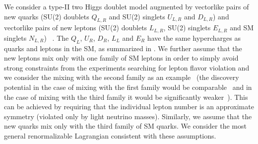 


We consider a type-II two Higgs doublet model augmented by vectorlike pairs of new quarks (SU(2) doublets $Q_{L,R}$ and SU(2) singlets $U_{L,R}$ and $D_{L,R}$)
and vectorlike pairs of new leptons (SU(2) doublets $L_{L,R}$,  SU(2) singlets $E_{L,R}$ and  SM singlets $N_{L,R}$)~ \cite{Dermisek:2015oja}. The  $Q_{L}$, $U_{R}$,  $D_{R}$, $L_L$ and $E_R$ have the same  hypercharges as quarks and leptons in the SM, as summarized in .
We  further assume that the new leptons mix only with one family of SM leptons in order to simply avoid strong constraints from the experiments searching for lepton flavor violation and we consider the mixing with the second family as an example~\cite{Kannike:2011ng,Dermisek:2013gta,Falkowski:2013jya,Falkowski:2014ffa,Dermisek:2014cia,Dermisek:2014qca,Dermisek:2015vra,Dermisek:2015oja,Dermisek:2015hue,Dermisek:2016via} (the discovery potential in the case of mixing with the first family would be comparable~\cite{Dermisek:2014qca} and in the case of mixing with the third family it would be significantly weaker~\cite{Dermisek:2014qca,Kumar:2015tna}). This can be achieved by requiring that the individual lepton number is an approximate symmetry (violated only by light neutrino masses). Similarly,  we assume that the new quarks mix only with the third family of SM quarks. We consider the most general renormalizable Lagrangian consistent with these assumptions.

